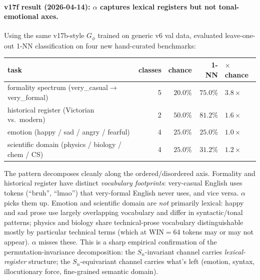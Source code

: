 \documentclass[11pt, a4paper]{article}
\theoremstyle{plain}
\theoremstyle{definition}
\theoremstyle{remark}
\begin{document}
\paragraph{v17f result (2026-04-14): $\alpha$ captures lexical registers but not tonal-emotional axes.}
Using the same v17b-style $G_\phi$ trained on generic v6 val data, evaluated leave-one-out 1-NN classification on four new hand-curated benchmarks:
\begin{center}
\small
\begin{tabular}{lrrrl}
\toprule
task & classes & chance & 1-NN & $\times$chance \\
\midrule
formality spectrum (very\_casual$\rightarrow$very\_formal) & 5 & $20.0\%$ & $\mathbf{75.0\%}$ & $\mathbf{3.8\times}$ \\
historical register (Victorian vs.\ modern)              & 2 & $50.0\%$ & $\mathbf{81.2\%}$ & $1.6\times$ \\
emotion (happy / sad / angry / fearful)                  & 4 & $25.0\%$ & $25.0\%$ & $1.0\times$ \\
scientific domain (physics / biology / chem / CS)        & 4 & $25.0\%$ & $31.2\%$ & $1.2\times$ \\
\bottomrule
\end{tabular}
\end{center}
The pattern decomposes cleanly along the ordered/disordered axis.
Formality and historical register have distinct \emph{vocabulary footprints}: very-casual English uses tokens (``bruh'', ``lmao'') that very-formal English never uses, and vice versa.
$\alpha$ picks them up.
Emotion and scientific domain are \emph{not} primarily lexical: happy and sad prose use largely overlapping vocabulary and differ in syntactic/tonal patterns; physics and biology share technical-prose vocabulary distinguishable mostly by particular technical terms (which at $\text{WIN}{=}64$ tokens may or may not appear).
$\alpha$ misses these.
This is a sharp empirical confirmation of the permutation-invariance decomposition: the $S_n$-invariant channel carries \emph{lexical-register} structure; the $S_n$-equivariant channel carries what's left (emotion, syntax, illocutionary force, fine-grained semantic domain).
\end{document}
